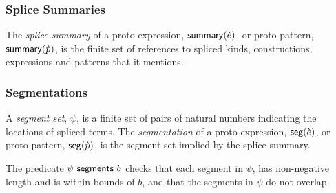 \subsubsection{Splice Summaries}
The \emph{splice summary} of a proto-expression, $\mathsf{summary}(\grave{e})$, or proto-pattern, $\mathsf{summary}(\grave{p})$, is the finite set of references to spliced kinds, constructions, expressions and patterns that it mentions.

\subsubsection{Segmentations}
A \emph{segment set}, $\psi$, is a finite set of pairs of natural numbers indicating the locations of spliced terms. The \emph{segmentation} of a proto-expression, $\mathsf{seg}(\grave{e})$, or proto-pattern, $\mathsf{seg}(\grave{p})$, is the segment set implied by the splice summary.

The predicate $\psi~\mathsf{segments}~b$ checks that each segment in $\psi$, has non-negative length and is within bounds of $b$, and that the segments in $\psi$ do not overlap.


